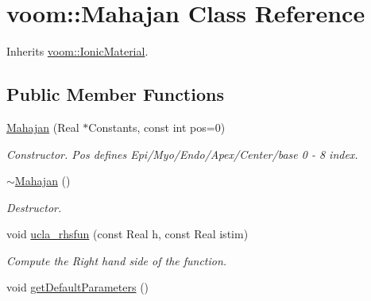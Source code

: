 \hypertarget{classvoom_1_1_mahajan}{
\section{voom::Mahajan Class Reference}
\label{classvoom_1_1_mahajan}
}


Inherits \hyperlink{classvoom_1_1_ionic_material}{voom::IonicMaterial}.\subsection*{Public Member Functions}
\begin{DoxyCompactItemize}
\item 
\hypertarget{classvoom_1_1_mahajan_a443c32532381dc9638113a2f34ebef44}{
\hyperlink{classvoom_1_1_mahajan_a443c32532381dc9638113a2f34ebef44}{Mahajan} (Real $\ast$Constants, const int pos=0)}
\label{classvoom_1_1_mahajan_a443c32532381dc9638113a2f34ebef44}

\begin{DoxyCompactList}\small\item\em Constructor. Pos defines Epi/Myo/Endo/Apex/Center/base 0 -\/ 8 index. \item\end{DoxyCompactList}\item 
\hypertarget{classvoom_1_1_mahajan_aae569b0642e2f30a5d2f7dd4cd454e5a}{
\hyperlink{classvoom_1_1_mahajan_aae569b0642e2f30a5d2f7dd4cd454e5a}{$\sim$Mahajan} ()}
\label{classvoom_1_1_mahajan_aae569b0642e2f30a5d2f7dd4cd454e5a}

\begin{DoxyCompactList}\small\item\em Destructor. \item\end{DoxyCompactList}\item 
void \hyperlink{classvoom_1_1_mahajan_a823f525969c509dc65b22f1f88efe173}{ucla\_\-rhsfun} (const Real h, const Real istim)
\begin{DoxyCompactList}\small\item\em Compute the Right hand side of the function. \item\end{DoxyCompactList}\item 
\hypertarget{classvoom_1_1_mahajan_a1f44e82afa0c7afef30c56ad3ce2b083}{
void \hyperlink{classvoom_1_1_mahajan_a1f44e82afa0c7afef30c56ad3ce2b083}{getDefaultParameters} ()}
\label{classvoom_1_1_mahajan_a1f44e82afa0c7afef30c56ad3ce2b083}


\end{DoxyCompactItemize}
